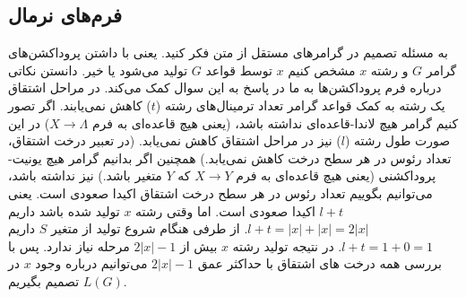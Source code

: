 \documentclass[main.tex]{subfiles}
\begin{document}
	\subsection{فرم‌های نرمال}
	به مسئله تصمیم در گرامر‌های مستقل از متن فکر کنید. یعنی با داشتن پروداکشن‌های گرامر $G$ و رشته $x$ مشخص کنیم $x$ توسط قواعد $G$ تولید می‌شود یا خیر.  دانستن نکاتی درباره فرم پروداکشن‌ها به ما در پاسخ به این سوال کمک می‌کند. در مراحل اشتقاق
	یک رشته به کمک قواعد گرامر تعداد ترمینال‌های رشته ($t$) کاهش نمی‌یابند. اگر تصور کنیم گرامر هیچ لاندا-قاعده‌ای
	 نداشته باشد، (یعنی هیچ قاعده‌ای به فرم 
	 $X \rightarrow \Lambda$)
	 در این صورت طول رشته ($l$) نیز در مراحل اشتقاق کاهش نمی‌یابد. (در تعبیر درخت اشتقاق، تعداد رئوس در هر سطح درخت کاهش نمی‌یابد.) همچنین اگر بدانیم گرامر هیچ یونیت-پروداکشنی 
	 (یعنی هیچ قاعده‌ای به فرم
	 $X \rightarrow Y$
	 که $Y$ متغیر باشد.)
	 نیز نداشته باشد، می‌توانیم بگوییم تعداد رئوس در هر سطح درخت اشتقاق اکیدا صعودی است. یعنی $l+ t$ اکیدا صعودی است. اما وقتی رشته $x$ تولید شده باشد داریم 
	 $l + t = |x| + |x| = 2|x|$.
	 از طرفی هنگام شروع تولید از متغیر $S$ داریم
	 $l + t = 1 + 0 = 1$.
	 در نتیجه تولید رشته $x$ بیش از
	 $2|x| - 1$
	 مرحله نیاز ندارد. پس با بررسی همه درخت های اشتقاق با حداکثر عمق 
	 $2|x| - 1$
	 می‌توانیم درباره وجود $x$ در 
	 $L(G)$
	 تصمیم بگیریم.
	 
\end{document}

